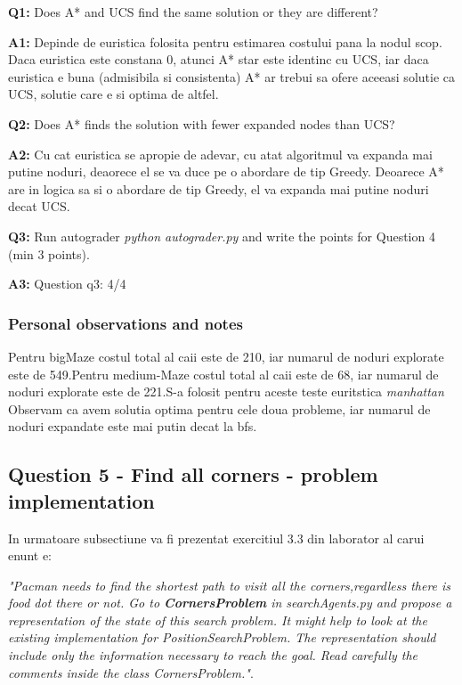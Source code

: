 \textbf{Q1:} Does A* and UCS find the same solution or they are different?


\textbf{A1:} Depinde de euristica folosita pentru estimarea costului pana la nodul scop. Daca euristica este constana 0, atunci A* star este identinc cu UCS, iar daca euristica e buna (admisibila si consistenta) A* ar trebui sa ofere aceeasi solutie ca UCS, solutie care e si optima de altfel.


\textbf{Q2:} Does A* finds the solution with fewer expanded nodes than UCS?


\textbf{A2:} Cu cat euristica se apropie de adevar, cu atat algoritmul va expanda mai putine noduri, deaorece el se va duce pe o abordare de tip Greedy. Deoarece A* are in logica sa si o abordare de tip Greedy, el va expanda mai putine noduri decat UCS.

\textbf{Q3:} Run autograder \textit{python autograder.py} and write the points for Question 4 (min 3 points).


\textbf{A3:} Question q3: 4/4


\subsubsection{Personal observations and notes}
Pentru bigMaze costul total al caii este de 210, iar numarul de noduri explorate este de 549.Pentru medium-Maze costul total al caii este de 68, iar numarul de noduri explorate este de 221.S-a folosit pentru aceste teste euritstica \textit{manhattan} Observam ca avem solutia optima pentru cele doua probleme, iar numarul de noduri expandate este mai putin decat la bfs.
\vspace{0.75cm}

\subsection{Question 5 - Find all corners - problem implementation}
In urmatoare subsectiune va fi prezentat exercitiul 3.3 din laborator al carui enunt e: \newline


\textit{"Pacman  needs  to  find  the  shortest  path  to  visit  all  the  corners,regardless  there  is  food  dot  there  or  not. Go to \textbf{CornersProblem} in searchAgents.py and propose a representation of the state of this search problem. It might help to look at the existing implementation for PositionSearchProblem. The representation should include only the information necessary to reach the goal. Read carefully the comments inside the class CornersProblem."}.


